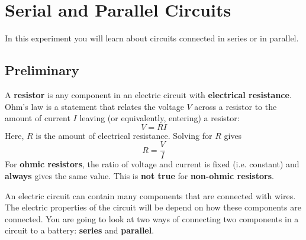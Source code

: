 \setcounter{chapter}{2}
\chapter{Serial and Parallel Circuits}
In this experiment you will learn about circuits connected in series or in parallel.
\section{Preliminary}
A \textbf{resistor} is any component in an electric circuit with \textbf{electrical resistance}. Ohm's law is a statement that relates the voltage $V$ across a resistor to the amount of current $I$ leaving (or equivalently, entering) a resistor:
\begin{equation}
	V = R I
\end{equation}
Here, $R$ is the amount of electrical resistance. Solving for $R$ gives
\begin{equation} \label{eq.03.ROhmLaw}
	R = \frac{V}{I}
\end{equation}
For \textbf{ohmic resistors}, the ratio of voltage and current is fixed (i.e. constant) and \textbf{always} gives the same value. This is \textbf{not true} for \textbf{non-ohmic resistors}.

An electric circuit can contain many components that are connected with wires. The electric properties of the circuit will be depend on how these components are connected. You are going to look at two ways of connecting two components in a circuit to a battery: \textbf{series} and \textbf{parallel}.
